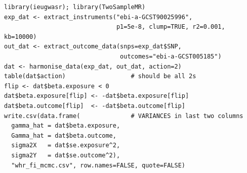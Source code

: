 \documentclass[12pt,a4paper]{article}
\begin{document}
\begin{verbatim}
library(ieugwasr); library(TwoSampleMR)
exp_dat <- extract_instruments("ebi-a-GCST90025996",
                               p1=5e-8, clump=TRUE, r2=0.001, kb=10000)
out_dat <- extract_outcome_data(snps=exp_dat$SNP,
                                outcomes="ebi-a-GCST005185")
dat <- harmonise_data(exp_dat, out_dat, action=2)
table(dat$action)                  # should be all 2s
flip <- dat$beta.exposure < 0
dat$beta.exposure[flip] <- -dat$beta.exposure[flip]
dat$beta.outcome[flip]  <- -dat$beta.outcome[flip]
write.csv(data.frame(              # VARIANCES in last two columns
  gamma_hat = dat$beta.exposure,
  Gamma_hat = dat$beta.outcome,
  sigma2X   = dat$se.exposure^2,
  sigma2Y   = dat$se.outcome^2),
  "whr_fi_mcmc.csv", row.names=FALSE, quote=FALSE)
\end{verbatim}
\end{document}
